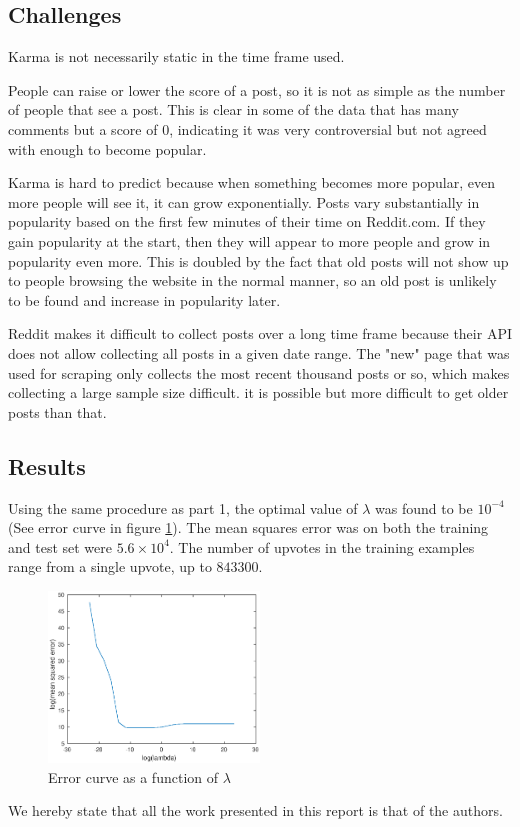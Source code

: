 \documentclass[10pt,twocolumn]{article}
\begin{document}
\subsection{Challenges}
Karma is not necessarily static in the time frame used.

People can raise or lower the score of a post, so it is not as simple as the number of people that see a post. This is clear in some of the data that has many comments but a score of 0, indicating it was very controversial but not agreed with enough to become popular.

Karma is hard to predict because when something becomes more popular, even more people will see it, it can grow exponentially. Posts vary substantially in popularity based on the first few minutes of their time on Reddit.com. If they gain popularity at the start, then they will appear to more people and grow in popularity even more. This is doubled by the fact that old posts will not show up to people browsing the website in the normal manner, so an old post is unlikely to be found and increase in popularity later.

Reddit makes it difficult to collect posts over a long time frame because their API does not allow collecting all posts in a given date range. The "new" page that was used for scraping only collects the most recent thousand posts or so, which makes collecting a large sample size difficult. it is possible but more difficult to get older posts than that.

\subsection{Results}

Using the same procedure as part 1, the optimal value of $\lambda$ was found to be $10^{-4}$ (See error curve in figure \ref{fig:ecurve2-lambda}).
The mean squares error was on both the training and test set were $5.6\times 10^{4}$.
The number of upvotes in the training examples range from a single upvote, up to $843300$.

\begin{figure}[htpb]
	\centering
	\includegraphics[width=0.5\textwidth]{part2-error-curve}
	\caption{Error curve as a function of $\lambda$}
	\label{fig:ecurve2-lambda}
\end{figure}

We hereby state that all the work presented in this report is that of the authors.
\end{document}
